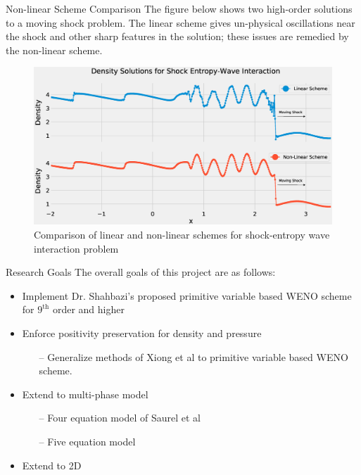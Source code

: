 \documentclass[9pt]{beamer}
\begin{document}
\begin{frame}{Non-linear Scheme Comparison}
The figure below shows two high-order solutions to a moving shock problem.  The linear scheme gives un-physical oscillations near the shock and other sharp features in the solution;  these issues are remedied by the non-linear scheme.
\begin{figure}[H]
\centering
\includegraphics[scale=0.25]{DensitySolutions.eps}\caption{Comparison of linear and non-linear schemes for shock-entropy wave interaction problem}
  \label{fig:BurgersZoom}
\end{figure}
\end{frame}


\begin{frame}{Research Goals}
  The overall goals of this project are as follows:
  \begin{itemize}
  \item Implement Dr. Shahbazi's proposed primitive variable based WENO scheme \cite{Shahbazi} for $9^{\text{th}}$ order and higher
  \item Enforce positivity preservation for density and pressure
  \begin{itemize}
  \item[--] Generalize methods of Xiong et al \cite{Positivity2014} to primitive variable based WENO scheme.
  \end{itemize}
  \item Extend to multi-phase model
  \begin{itemize}
  \item[--] Four equation model of Saurel et al \cite{FourEquationModel}
  \item[--] Five equation model \cite{FiveEquationModel}
  \end{itemize}
  \item Extend to 2D
  \end{itemize}
\end{frame}
\end{document}
